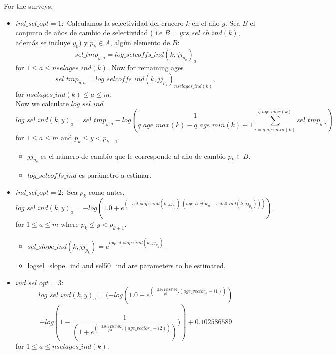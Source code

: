 \documentclass{article}
\begin{document}
For the surveys:\\
\begin{itemize}

\item $ind\_sel\_opt=1:$
Calculamos la selectividad del crucero $k$ en el año $y$. Sea $B$ el conjunto de años de cambio de selectividad ( i.e $B= yrs\_sel\_ch\_ind(k)$, además se incluye $y_0$) y $p_k\in A$, algún elemento de $B$:
\begin{equation}
    sel\_tmp_{y,a} = log\_selcoffs\_ind(k,jj_{p_k})_a
\end{equation}
for $1\leq a \leq nselages\_ind(k)$.
Now for remaining ages
\begin{equation}
    sel\_tmp_{y,a}= log\_selcoffs\_ind(k,jj_{p_k})_{nselages\_ind(k)},
\end{equation}
for $nselages\_ind(k)\leq a \leq m$. \\

Now we calculate $log\_sel\_ind$
     \begin{equation}
        log\_sel\_ind(k,y)_a=sel\_tmp_{y,a}-log\left(\dfrac{1}{q\_age\_max(k)-q\_age\_min(k)+1}\sum_{i=q\_age\_min(k)}^{q\_age\_max(k)}sel\_tmp_{y,i}\right)
    \end{equation}
    for $1\leq a \leq m$ and $p_k\leq y < p_{k+1}$.\\ 
\begin{itemize}    
    \item $jj_{p_k}$ es el número de cambio que le corresponde al año de cambio $p_k\in B$.
    \item $log\_selcoffs\_ind$ es parámetro a estimar.
\end{itemize}

    
    \item $ind\_sel\_opt=2:$
    Sea $p_k$ como antes, 
\begin{equation}
            log\_sel\_ind(k,y)_a = - log( 1.0 + e^{(-sel\_slope\_ind(k,jj_{p_k}) . ( age\_vector_a - sel50\_ind(k,jj_{p_k})) )}).
        \end{equation}
        for $1\leq a \leq m
$ where $p_k\leq y < p_{k+1}$.
        \begin{itemize}
            \item $sel\_slope\_ind(k,jj_{p_k}) = e^{logsel\_slope\_ind(k,jj_{p_k})}$.
            \item logsel\_slope\_ind and sel50\_ind are parameters to be estimated.
        \end{itemize}

    \item $ind\_sel\_opt=3:$
     \begin{equation}
        log\_sel\_ind(k,y)_a     = ( -log(1.0 + e^{(\frac{-2.9444389792}{p1} . ( age\_vector_a - i1) )}) 
\end{equation}
    \begin{equation}
          +log\left(1 - \frac{1}{(1 + e^{(\frac{-2.9444389792}{p3} . ( age\_vector_a - i2))})} ) \right)+0.102586589 
    \end{equation}
for $1\leq a \leq nselages\_ind(k).$ \\


\end{itemize}
\end{document}
